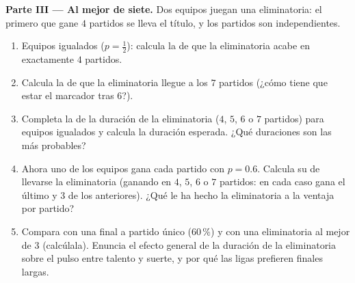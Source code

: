 \begin{problem}
\medskip
\noindent\textbf{Parte III --- Al mejor de siete.}
Dos equipos juegan una eliminatoria: el primero que gane $4$ partidos se
lleva el título, y los partidos son independientes.
\begin{enumerate}[resume]
  \item Equipos igualados ($p = \frac12$): calcula la  de que
        la eliminatoria acabe en exactamente $4$ partidos.
  \item Calcula la  de que la eliminatoria llegue a los $7$
        partidos (¿cómo tiene que estar el marcador tras $6$?).
  \item Completa la  de la duración de la eliminatoria ($4$,
        $5$, $6$ o $7$ partidos) para equipos igualados y calcula la
        duración esperada. ¿Qué duraciones son las más probables?
  \item Ahora uno de los equipos gana cada partido con $p = 0.6$. Calcula
        su  de llevarse la eliminatoria (ganando en $4$, $5$,
        $6$ o $7$ partidos: en cada caso gana el último y $3$ de los
        anteriores). ¿Qué le ha hecho la eliminatoria a la ventaja por
        partido?
  \item Compara con una final a partido único ($60\,\%$) y con una
        eliminatoria al mejor de $3$ (calcúlala). Enuncia el efecto
        general de la duración de la eliminatoria sobre el pulso entre
        talento y suerte, y por qué las ligas prefieren finales largas.
\end{enumerate}


\end{problem}
